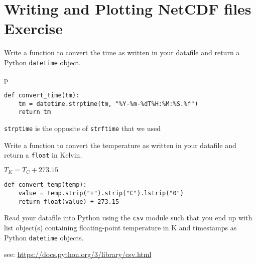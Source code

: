 \documentclass[a4paper,11pt]{article}
\begin{document}
\section{Writing and Plotting NetCDF files Exercise}
\begin{question}
Write a function to convert the time as written in
your datafile and return a Python \texttt{datetime}
object.
\end{question}p
\newsavebox\timeconv
\begin{lrbox}{\timeconv}
\begin{minipage}{\textwidth}
\begin{verbatim}
def convert_time(tm):
    tm = datetime.strptime(tm, "%Y-%m-%dT%H:%M:%S.%f")
    return tm
\end{verbatim}
\end{minipage}
\end{lrbox}
\begin{solution}
\noindent\usebox\timeconv

\texttt{strptime} is the opposite of \texttt{strftime} that we used
\end{solution}
\begin{question}
Write a function to convert the temperature as
written in your datafile and return a \texttt{float} in
Kelvin.

{\center $T_K = T_C + 273.15$}
\end{question}
\newsavebox\tempconv
\begin{lrbox}{\tempconv}
\begin{minipage}{\textwidth}
\begin{verbatim}
def convert_temp(temp):
    value = temp.strip("+").strip("C").lstrip("0")
    return float(value) + 273.15
\end{verbatim}
\end{minipage}
\end{lrbox}
\begin{solution}
\noindent\usebox\tempconv
\end{solution}
\begin{question}
Read your datafile into Python using the \texttt{csv} module such
that you end up with list object(s) containing floating-point
temperature in K and timestamps as Python \texttt{datetime} objects.


see: \url{https://docs.python.org/3/library/csv.html}
\end{question}
\newsavebox\csvread
\end{document}

